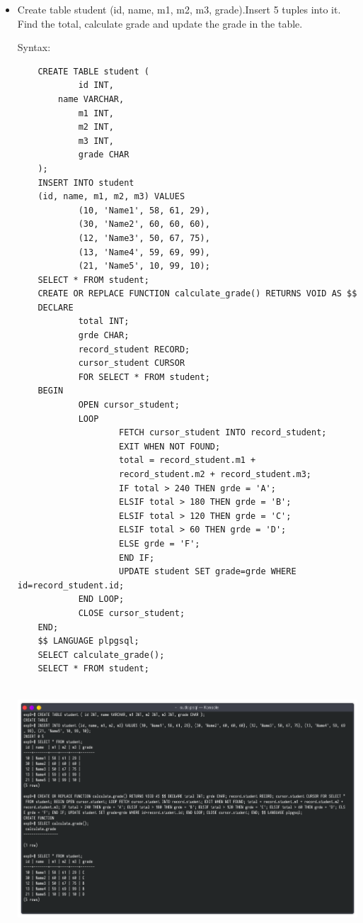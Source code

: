 \documentclass[13pt,oneside]{book}
\begin{document}
\begin{itemize}
    \item
    Create table student (id, name, m1, m2, m3, grade).Insert 5 tuples into it. Find the total,
     calculate grade and update the grade in the table.
     
    Syntax:
    \begin{verbatim}
    CREATE TABLE student (
            id INT,
        name VARCHAR,
            m1 INT,
            m2 INT,
            m3 INT,
            grade CHAR
    );
    INSERT INTO student
    (id, name, m1, m2, m3) VALUES
            (10, 'Name1', 58, 61, 29),
            (30, 'Name2', 60, 60, 60),
            (12, 'Name3', 50, 67, 75),
            (13, 'Name4', 59, 69, 99),
            (21, 'Name5', 10, 99, 10);
    SELECT * FROM student;
    CREATE OR REPLACE FUNCTION calculate_grade() RETURNS VOID AS $$
    DECLARE
            total INT;
            grde CHAR;
            record_student RECORD;
            cursor_student CURSOR
            FOR SELECT * FROM student;
    BEGIN
            OPEN cursor_student;
            LOOP
                    FETCH cursor_student INTO record_student;
                    EXIT WHEN NOT FOUND;
                    total = record_student.m1 + 
                    record_student.m2 + record_student.m3;
                    IF total > 240 THEN grde = 'A';
                    ELSIF total > 180 THEN grde = 'B';
                    ELSIF total > 120 THEN grde = 'C';
                    ELSIF total > 60 THEN grde = 'D';
                    ELSE grde = 'F';
                    END IF;
                    UPDATE student SET grade=grde WHERE id=record_student.id;
            END LOOP;
            CLOSE cursor_student;
    END;
    $$ LANGUAGE plpgsql;
    SELECT calculate_grade();
    SELECT * FROM student;
    
    \end{verbatim}
    \includegraphics[width=\textwidth]{img/p9/ss1.png}
    

\end{itemize}
\end{document}
